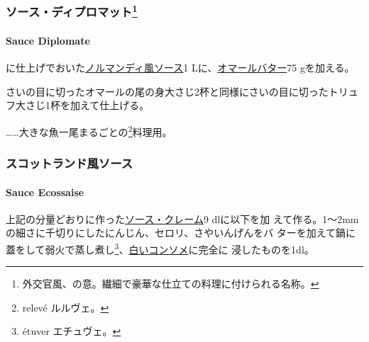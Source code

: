 \begin{recette}
\maeaki

\hypertarget{ux30bdux30fcux30b9ux30c7ux30a3ux30d7ux30edux30deux30c3ux30c844}{%
\subsubsection[ソース・ディプロマット]{\texorpdfstring{ソース・ディプロマット\footnote{外交官風、の意。繊細で豪華な仕立ての料理に付けられる名称。}}{ソース・ディプロマット}}\label{ux30bdux30fcux30b9ux30c7ux30a3ux30d7ux30edux30deux30c3ux30c844}}

\hypertarget{sauce-diplomate}{%
\paragraph{Sauce Diplomate}\label{sauce-diplomate}}

に仕上げでおいた\protect\hyperlink{sauce-normande}{ノルマンディ風ソース}1
Lに、\protect\hyperlink{}{オマールバター}75 gを加える。

さいの目に切ったオマールの尾の身大さじ2杯と同様にさいの目に切ったトリュ
フ大さじ1杯を加えて仕上げる。

\ldots{}\ldots{}大きな魚一尾まるごとの\footnote{relevé ルルヴェ。}料理用。

\maeaki

\hypertarget{ux30b9ux30b3ux30c3ux30c8ux30e9ux30f3ux30c9ux98a8ux30bdux30fcux30b9}{%
\subsubsection{スコットランド風ソース}\label{ux30b9ux30b3ux30c3ux30c8ux30e9ux30f3ux30c9ux98a8ux30bdux30fcux30b9}}

\hypertarget{sauce-ecossaise}{%
\paragraph{Sauce Ecossaise}\label{sauce-ecossaise}}


上記の分量どおりに作った\protect\hyperlink{sauce-creme}{ソース・クレーム}9
dlに以下を加
えて作る。1〜2mmの細さに千切りにしたにんじん、セロリ、さやいんげんをバ
ターを加えて鍋に蓋をして弱火で蒸し煮し\footnote{étuver エチュヴェ。}、\protect\hyperlink{}{白いコンソメ}に完全に
浸したものを1dl。


\end{recette}
